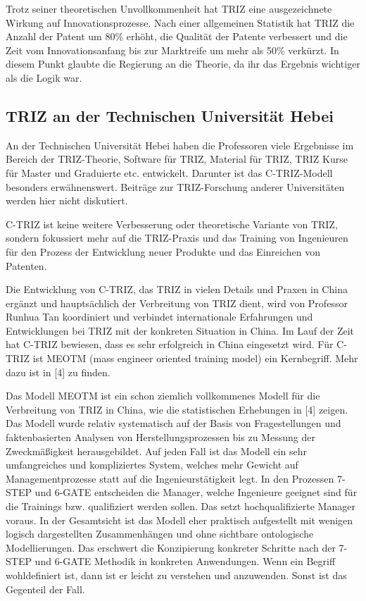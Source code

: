 \documentclass[11pt,a4paper]{article}
\begin{document}
Trotz seiner theoretischen Unvollkommenheit hat TRIZ eine ausgezeichnete
Wirkung auf Innovationsprozesse. Nach einer allgemeinen Statistik hat TRIZ die
Anzahl der Patent um 80\% erhöht, die Qualität der Patente verbessert und die
Zeit vom Innovationsanfang bis zur Marktreife um mehr als 50\% verkürzt. In
diesem Punkt glaubte die Regierung an die Theorie, da ihr das Ergebnis
wichtiger als die Logik war.

\subsection{TRIZ an der Technischen Universität Hebei}

An der Technischen Universität Hebei haben die Professoren viele Ergebnisse im
Bereich der TRIZ-Theorie, Software für TRIZ, Material für TRIZ, TRIZ Kurse für
Master und Graduierte etc. entwickelt. Darunter ist das C-TRIZ-Modell
besonders erwähnenswert. Beiträge zur TRIZ-Forschung anderer Universitäten
werden hier nicht diskutiert.

C-TRIZ ist keine weitere Verbesserung oder theoretische Variante von TRIZ,
sondern fokussiert mehr auf die TRIZ-Praxis und das Training von Ingenieuren
für den Prozess der Entwicklung neuer Produkte und das Einreichen von
Patenten.

Die Entwicklung von C-TRIZ, das TRIZ in vielen Details und Praxen in China
ergänzt und hauptsächlich der Verbreitung von TRIZ dient, wird von Professor
Runhua Tan koordiniert und verbindet internationale Erfahrungen und
Entwicklungen bei TRIZ mit der konkreten Situation in China. Im Lauf der Zeit
hat C-TRIZ bewiesen, dass es sehr erfolgreich in China eingesetzt wird. Für
C-TRIZ ist MEOTM (mass engineer oriented training model) ein Kernbegriff.
Mehr dazu ist in [4] zu finden.

Das Modell MEOTM ist ein schon ziemlich vollkommenes Modell für die
Verbreitung von TRIZ in China, wie die statistischen Erhebungen in [4] zeigen.
Das Modell wurde relativ systematisch auf der Basis von Fragestellungen und
faktenbasierten Analysen von Herstellungsprozessen bis zu Messung der
Zweckmäßigkeit herausgebildet. Auf jeden Fall ist das Modell ein sehr
umfangreiches und kompliziertes System, welches mehr Gewicht auf
Managementprozesse statt auf die Ingenieurstätigkeit legt. In den Prozessen
7-STEP und 6-GATE entscheiden die Manager, welche Ingenieure geeignet sind für
die Trainings bzw. qualifiziert werden sollen. Das setzt hochqualifizierte
Manager voraus.  In der Gesamtsicht ist das Modell eher praktisch aufgestellt
mit wenigen logisch dargestellten Zusammenhängen und ohne sichtbare
ontologische Modellierungen.  Das erschwert die Konzipierung konkreter
Schritte nach der 7-STEP und 6-GATE Methodik in konkreten Anwendungen. Wenn
ein Begriff wohldefiniert ist, dann ist er leicht zu verstehen und
anzuwenden. Sonst ist das Gegenteil der Fall.
\end{document}
